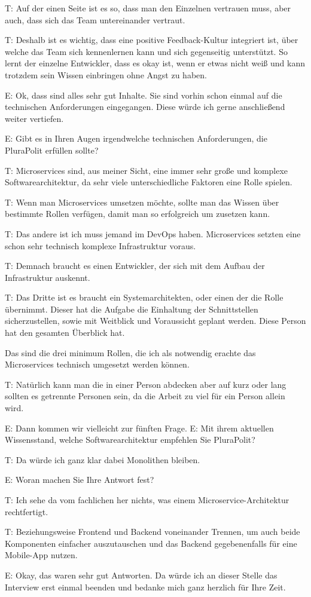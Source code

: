  \label{appendix:t-29}
T: Auf der einen Seite ist es so, dass man den  Einzelnen vertrauen muss, aber auch, dass sich das Team untereinander vertraut.

 \label{appendix:t-30}
T: Deshalb ist es wichtig, dass eine positive Feedback-Kultur integriert ist, über welche das Team sich kennenlernen kann und sich gegenseitig unterstützt. So lernt der einzelne Entwickler, dass es okay ist, wenn er etwas nicht weiß und kann trotzdem sein Wissen einbringen ohne Angst zu haben.

E: Ok, dass sind alles sehr gut Inhalte. Sie sind vorhin schon einmal auf die technischen Anforderungen eingegangen. Diese würde ich gerne anschließend weiter vertiefen.

E: Gibt es in Ihren Augen irgendwelche technischen Anforderungen, die PluraPolit erfüllen sollte? 

T: Microservices sind, aus meiner Sicht, eine immer sehr große und komplexe Softwarearchitektur, da sehr viele unterschiedliche Faktoren eine Rolle spielen.

 \label{appendix:t-31}
T: Wenn man Microservices umsetzen möchte, sollte man das Wissen über bestimmte Rollen verfügen, damit man so erfolgreich um zusetzen kann.

 \label{appendix:t-32}
T: Das andere ist ich muss jemand im DevOps haben. Microservices setzten eine schon sehr technisch komplexe Infrastruktur voraus.

 \label{appendix:t-33}
T: Demnach braucht es einen Entwickler, der sich mit dem Aufbau der Infrastruktur auskennt.

 \label{appendix:t-34}
T:  Das Dritte ist es braucht ein Systemarchitekten, oder einen der die Rolle übernimmt. Dieser hat die Aufgabe die Einhaltung der Schnittstellen sicherzustellen, sowie mit Weitblick und Voraussicht geplant werden. Diese Person hat den gesamten Überblick hat.

 Das sind die drei minimum Rollen, die ich als notwendig erachte das Microservices technisch umgesetzt werden können. 

 \label{appendix:t-35}
T: Natürlich kann man die in einer Person abdecken aber auf kurz oder lang sollten es getrennte Personen sein, da die Arbeit zu viel für ein Person allein wird. 

E: Dann kommen wir vielleicht zur fünften Frage.
E: Mit ihrem aktuellen Wissensstand, welche Softwarearchitektur empfehlen Sie PluraPolit? 

 \label{appendix:t-36}
T: Da würde ich ganz klar dabei Monolithen bleiben.

E: Woran machen Sie Ihre Antwort fest?

 \label{appendix:t-37}
T: Ich sehe da vom fachlichen her nichts, was einem Microservice-Architektur rechtfertigt.

 \label{appendix:t-38}
T: Beziehungsweise Frontend und Backend voneinander Trennen, um auch beide Komponenten einfacher auszutauschen und das Backend gegebenenfalls für eine Mobile-App nutzen.

E: Okay, das waren sehr gut Antworten. Da würde ich an dieser Stelle das Interview erst einmal beenden und bedanke mich ganz herzlich für Ihre Zeit.

